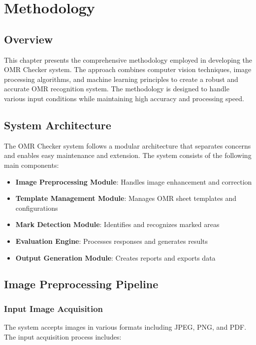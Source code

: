 \chapter{Methodology}
\label{ch:methodology}

\section{Overview}

This chapter presents the comprehensive methodology employed in developing the OMR Checker system. The approach combines computer vision techniques, image processing algorithms, and machine learning principles to create a robust and accurate OMR recognition system. The methodology is designed to handle various input conditions while maintaining high accuracy and processing speed.

\section{System Architecture}

The OMR Checker system follows a modular architecture that separates concerns and enables easy maintenance and extension. The system consists of the following main components:

\begin{itemize}
\item \textbf{Image Preprocessing Module}: Handles image enhancement and correction
\item \textbf{Template Management Module}: Manages OMR sheet templates and configurations
\item \textbf{Mark Detection Module}: Identifies and recognizes marked areas
\item \textbf{Evaluation Engine}: Processes responses and generates results
\item \textbf{Output Generation Module}: Creates reports and exports data
\end{itemize}

\section{Image Preprocessing Pipeline}

\subsection{Input Image Acquisition}

The system accepts images in various formats including JPEG, PNG, and PDF. The input acquisition process includes:

